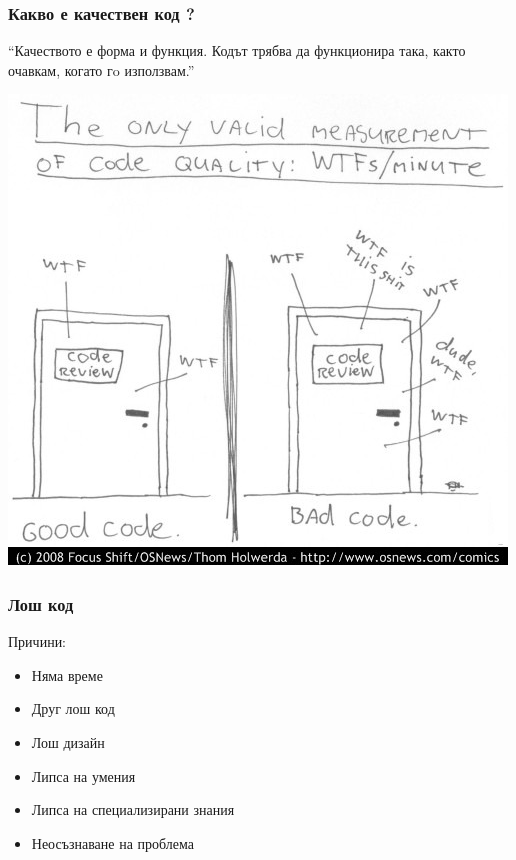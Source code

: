 
\begin{frame}
  \frametitle{Какво е качествен код ?}

\begin{exampleblock}{}
  {\large ``Качеството е форма и функция.  Кодът трябва да функционира така, както очавкам, когато гo използвам.''}
\end{exampleblock}
\end{frame}

\begin{frame}
   \begin{center}
   \includegraphics[width=\textwidth,height=0.8\textheight,keepaspectratio]{wtfm.jpg}
   \end{center}
\end{frame}

\begin{frame}
  \frametitle{Лош код}
  Причини:
  \begin{itemize}
  \item Няма време\pause
  \item Друг лош код\pause
  \item Лош дизайн\pause
  \item Липса на умения\pause
  \item Липса на специализирани знания\pause
  \item Неосъзнаване на проблема\pause
  \end{itemize}
\end{frame}

